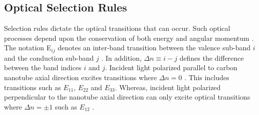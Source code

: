 \subsection{Optical Selection Rules}

Selection rules dictate the optical transitions that can occur. Such optical processes depend upon the conservation of both energy and angular momentum \cite{weismanKonoBook}. The notation E$_{ij}$ denotes an inter-band transition between the valence sub-band $i$ and the conduction sub-band $j$ \cite{weismanKonoBook}. In addition, $\Delta n \equiv i - j$ defines the difference between the band indices $i$ and $j$.  Incident light polarized parallel to carbon nanotube axial direction excites transitions where $\Delta n = 0$ \cite{weismanKonoBook}. This includes transitions such as $E_{11}$, $E_{22}$ and $E_{33}$. Whereas, incident light polarized perpendicular to the nanotube axial direction can only excite optical transitions where $\Delta n = \pm 1$ such as $E_{12}$ \cite{weismanKonoBook}. 

